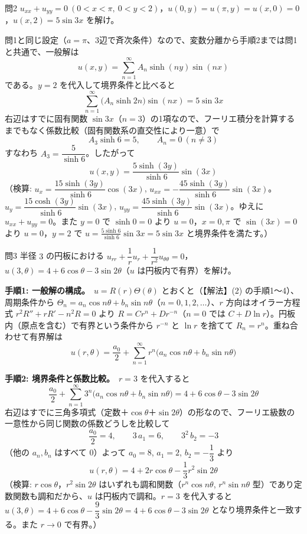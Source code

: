 \documentclass[a4paper,11pt]{article}
\begin{document}
\clearpage
\begin{mondaiboxS}{問2}
$u_{xx} + u_{yy} = 0\ (0 < x < \pi,\ 0 < y < 2)$，$u(0,y) = u(\pi,y) = u(x,0) = 0$，$u(x,2) = 5\sin 3x$ を解け。
\end{mondaiboxS}
\kaitou
問1と同じ設定（$a = \pi$、3辺で斉次条件）なので、変数分離から手順2までは問1と共通で、一般解は
\[
u(x,y) = \sum_{n=1}^{\infty} A_n \sinh(ny)\sin(nx)
\]
である。$y = 2$ を代入して境界条件と比べると
\[
\sum_{n=1}^{\infty} \bigl(A_n \sinh 2n\bigr)\sin(nx) = 5\sin 3x
\]
右辺はすでに固有関数 $\sin 3x$（$n=3$）の1項なので、フーリエ積分を計算するまでもなく係数比較（固有関数系の直交性により一意）で
\[
A_3 \sinh 6 = 5, \qquad A_n = 0\ (n \neq 3)
\]
すなわち $A_3 = \dfrac{5}{\sinh 6}$。したがって
\[
\boxed{\; u(x,y) = \frac{5\sinh(3y)}{\sinh 6}\sin(3x) \;}
\]
（検算: $u_x = \dfrac{15\sinh(3y)}{\sinh 6}\cos(3x)$, $u_{xx} = -\dfrac{45\sinh(3y)}{\sinh 6}\sin(3x)$。$u_y = \dfrac{15\cosh(3y)}{\sinh 6}\sin(3x)$, $u_{yy} = \dfrac{45\sinh(3y)}{\sinh 6}\sin(3x)$。ゆえに $u_{xx}+u_{yy}=0$。また $y=0$ で $\sinh 0=0$ より $u=0$，$x=0,\pi$ で $\sin(3x)=0$ より $u=0$，$y=2$ で $u = \frac{5\sinh 6}{\sinh 6}\sin 3x = 5\sin 3x$ と境界条件を満たす。）

\clearpage
\begin{mondaiboxS}{問3}
半径 $3$ の円板における $u_{rr} + \dfrac{1}{r}u_r + \dfrac{1}{r^2}u_{\theta\theta} = 0$，$u(3,\theta) = 4 + 6\cos\theta - 3\sin 2\theta$（$u$ は円板内で有界）を解け。
\end{mondaiboxS}
\kaitou
\textbf{手順1: 一般解の構成。}\ $u = R(r)\Theta(\theta)$ とおくと（【解法】(2) の手順1〜4）、周期条件から $\Theta_n = a_n\cos n\theta + b_n\sin n\theta$（$n = 0,1,2,\dots$）、$r$ 方向はオイラー方程式 $r^2R'' + rR' - n^2R = 0$ より $R = Cr^n + Dr^{-n}$（$n=0$ では $C + D\ln r$）。円板内（原点を含む）で有界という条件から $r^{-n}$ と $\ln r$ を捨てて $R_n = r^n$。重ね合わせて有界解は
\[
u(r,\theta) = \frac{a_0}{2} + \sum_{n=1}^{\infty} r^{n}\bigl(a_n\cos n\theta + b_n\sin n\theta\bigr)
\]

\textbf{手順2: 境界条件と係数比較。}\ $r = 3$ を代入すると
\[
\frac{a_0}{2} + \sum_{n=1}^{\infty} 3^{n}\bigl(a_n\cos n\theta + b_n\sin n\theta\bigr) = 4 + 6\cos\theta - 3\sin 2\theta
\]
右辺はすでに三角多項式（定数＋$\cos\theta$＋$\sin 2\theta$）の形なので、フーリエ級数の一意性から同じ関数の係数どうしを比較して
\[
\frac{a_0}{2} = 4, \qquad 3\,a_1 = 6, \qquad 3^{2}\,b_2 = -3
\]
（他の $a_n, b_n$ はすべて $0$）よって $a_0 = 8$, $a_1 = 2$, $b_2 = -\dfrac{1}{3}$ より
\[
\boxed{\; u(r,\theta) = 4 + 2r\cos\theta - \frac{1}{3}r^{2}\sin 2\theta \;}
\]
（検算: $r\cos\theta$，$r^2\sin2\theta$ はいずれも調和関数（$r^n\cos n\theta$, $r^n\sin n\theta$ 型）であり定数関数も調和だから、$u$ は円板内で調和。$r=3$ を代入すると $u(3,\theta) = 4 + 6\cos\theta - \dfrac{9}{3}\sin2\theta = 4 + 6\cos\theta - 3\sin2\theta$ となり境界条件と一致する。また $r \to 0$ で有界。）
\end{document}
